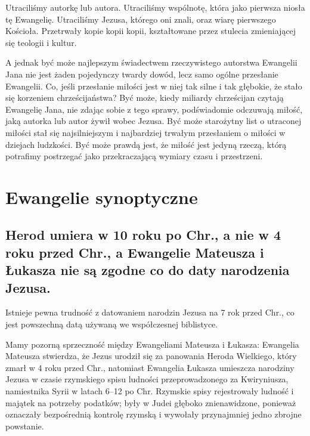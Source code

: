 Utraciliśmy autorkę lub autora.
Utraciliśmy wspólnotę, która jako pierwsza niosła tę Ewangelię.
Utraciliśmy Jezusa, którego oni znali, oraz wiarę pierwszego Kościoła.
Przetrwały kopie kopii kopii, kształtowane przez stulecia zmieniającej się teologii i kultur.

A jednak być może najlepszym świadectwem rzeczywistego autorstwa Ewangelii Jana nie jest żaden pojedynczy twardy dowód, lecz samo ogólne przesłanie Ewangelii.
Co, jeśli przesłanie miłości jest w niej tak silne i tak głębokie, że stało się korzeniem chrześcijaństwa?
Być może, kiedy miliardy chrześcijan czytają Ewangelię Jana, nie zdając sobie z tego sprawy, podświadomie odczuwają miłość, jaką autorka lub autor żywił wobec Jezusa.
Być może starożytny list o utraconej miłości stał się najsilniejszym i najbardziej trwałym przesłaniem o miłości w dziejach ludzkości.
Być może prawdą jest, że miłość jest jedyną rzeczą, którą potrafimy postrzegać jako przekraczającą wymiary czasu i przestrzeni.

\section{Ewangelie synoptyczne}\label{sec:synoptic-gospels}

\subsection{Herod umiera w 10 roku po Chr., a nie w 4 roku przed Chr., a Ewangelie Mateusza i Łukasza nie są zgodne co do daty narodzenia Jezusa.}\label{subsec:herod-dies-in-10ad-not-4bc-and-the-gospels-of-matthew-and-luke-are-not-in-agreement-on-the-date-of-jesuss-birth.}

Istnieje pewna trudność z datowaniem narodzin Jezusa na 7 rok przed Chr., co jest powszechną datą używaną we współczesnej biblistyce.

Mamy pozorną sprzeczność między Ewangeliami Mateusza i Łukasza: Ewangelia Mateusza stwierdza, że Jezus urodził się za panowania Heroda Wielkiego, który zmarł w 4 roku przed Chr., natomiast Ewangelia Łukasza umieszcza narodziny Jezusa w czasie rzymskiego spisu ludności przeprowadzonego za Kwiryniusza, namiestnika Syrii w latach 6–12 po Chr.
Rzymskie spisy rejestrowały ludność i majątek na potrzeby podatków; były w Judei głęboko znienawidzone, ponieważ oznaczały bezpośrednią kontrolę rzymską i wywołały przynajmniej jedno zbrojne powstanie.

